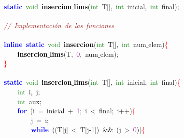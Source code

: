 \mbox{} \\
\mbox{}\textbf{\textcolor{Blue}{static}}\ \textcolor{ForestGreen}{void}\ \textbf{\textcolor{Black}{insercion$\_$lims}}\textcolor{BrickRed}{(}\textcolor{ForestGreen}{int}\ T\textcolor{BrickRed}{[],}\ \textcolor{ForestGreen}{int}\ inicial\textcolor{BrickRed}{,}\ \textcolor{ForestGreen}{int}\ final\textcolor{BrickRed}{);} \\
\mbox{} \\
\mbox{}\textit{\textcolor{Brown}{//\ Implementación\ de\ las\ funciones}} \\
\mbox{} \\
\mbox{}\textbf{\textcolor{Blue}{inline}}\ \textbf{\textcolor{Blue}{static}}\ \textcolor{ForestGreen}{void}\ \textbf{\textcolor{Black}{insercion}}\textcolor{BrickRed}{(}\textcolor{ForestGreen}{int}\ T\textcolor{BrickRed}{[],}\ \textcolor{ForestGreen}{int}\ num$\_$elem\textcolor{BrickRed}{)}\textcolor{Red}{\{} \\
\mbox{}\ \ \ \ \textbf{\textcolor{Black}{insercion$\_$lims}}\textcolor{BrickRed}{(}T\textcolor{BrickRed}{,}\ \textcolor{Purple}{0}\textcolor{BrickRed}{,}\ num$\_$elem\textcolor{BrickRed}{);} \\
\mbox{}\textcolor{Red}{\}} \\
\mbox{} \\
\mbox{}\textbf{\textcolor{Blue}{static}}\ \textcolor{ForestGreen}{void}\ \textbf{\textcolor{Black}{insercion$\_$lims}}\textcolor{BrickRed}{(}\textcolor{ForestGreen}{int}\ T\textcolor{BrickRed}{[],}\ \textcolor{ForestGreen}{int}\ inicial\textcolor{BrickRed}{,}\ \textcolor{ForestGreen}{int}\ final\textcolor{BrickRed}{)}\textcolor{Red}{\{} \\
\mbox{}\ \ \ \ \textcolor{ForestGreen}{int}\ i\textcolor{BrickRed}{,}\ j\textcolor{BrickRed}{;} \\
\mbox{}\ \ \ \ \textcolor{ForestGreen}{int}\ aux\textcolor{BrickRed}{;} \\
\mbox{}\ \ \ \ \textbf{\textcolor{Blue}{for}}\ \textcolor{BrickRed}{(}i\ \textcolor{BrickRed}{=}\ inicial\ \textcolor{BrickRed}{+}\ \textcolor{Purple}{1}\textcolor{BrickRed}{;}\ i\ \textcolor{BrickRed}{\textless{}}\ final\textcolor{BrickRed}{;}\ i\textcolor{BrickRed}{++)}\textcolor{Red}{\{} \\
\mbox{}\ \ \ \ \ \ \ \ j\ \textcolor{BrickRed}{=}\ i\textcolor{BrickRed}{;} \\
\mbox{}\ \ \ \ \ \ \ \ \textbf{\textcolor{Blue}{while}}\ \textcolor{BrickRed}{((}T\textcolor{BrickRed}{[}j\textcolor{BrickRed}{]}\ \textcolor{BrickRed}{\textless{}}\ T\textcolor{BrickRed}{[}j\textcolor{BrickRed}{-}\textcolor{Purple}{1}\textcolor{BrickRed}{])}\ \textcolor{BrickRed}{\&\&}\ \textcolor{BrickRed}{(}j\ \textcolor{BrickRed}{\textgreater{}}\ \textcolor{Purple}{0}\textcolor{BrickRed}{))}\textcolor{Red}{\{} \\
